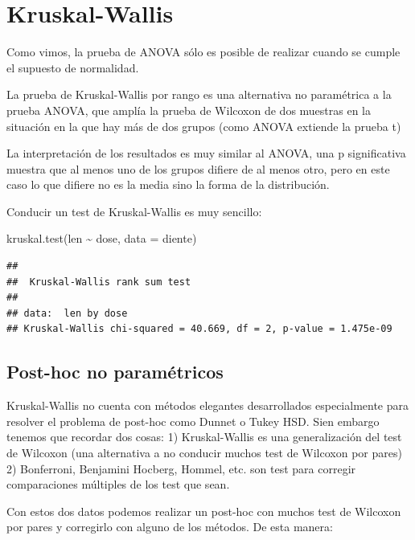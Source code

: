 \documentclass[
]{book}
\newenvironment{Shaded}{\begin{snugshade}}{\end{snugshade}}
\newcommand{\AttributeTok}[1]{\textcolor[rgb]{0.77,0.63,0.00}{#1}}
\newcommand{\FunctionTok}[1]{\textcolor[rgb]{0.00,0.00,0.00}{#1}}
\newcommand{\NormalTok}[1]{#1}
\newcommand{\SpecialCharTok}[1]{\textcolor[rgb]{0.00,0.00,0.00}{#1}}
\begin{document}
\hypertarget{kruskal-wallis}{%
\section{Kruskal-Wallis}\label{kruskal-wallis}}

Como vimos, la prueba de ANOVA sólo es posible de realizar cuando se cumple el supuesto de normalidad.

La prueba de Kruskal-Wallis por rango es una alternativa no paramétrica a la prueba ANOVA, que amplía la prueba de Wilcoxon de dos muestras en la situación en la que hay más de dos grupos (como ANOVA extiende la prueba t)

La interpretación de los resultados es muy similar al ANOVA, una p significativa muestra que al menos uno de los grupos difiere de al menos otro, pero en este caso lo que difiere no es la media sino la forma de la distribución.

Conducir un test de Kruskal-Wallis es muy sencillo:

\begin{Shaded}
\begin{Highlighting}[]
\FunctionTok{kruskal.test}\NormalTok{(len }\SpecialCharTok{\textasciitilde{}}\NormalTok{ dose, }\AttributeTok{data =}\NormalTok{ diente)}
\end{Highlighting}
\end{Shaded}

\begin{verbatim}
## 
##  Kruskal-Wallis rank sum test
## 
## data:  len by dose
## Kruskal-Wallis chi-squared = 40.669, df = 2, p-value = 1.475e-09
\end{verbatim}

\hypertarget{post-hoc-no-paramuxe9tricos}{%
\subsection{Post-hoc no paramétricos}\label{post-hoc-no-paramuxe9tricos}}

Kruskal-Wallis no cuenta con métodos elegantes desarrollados especialmente para resolver el problema de post-hoc como Dunnet o Tukey HSD. Sien embargo tenemos que recordar dos cosas: 1) Kruskal-Wallis es una generalización del test de Wilcoxon (una alternativa a no conducir muchos test de Wilcoxon por pares) 2) Bonferroni, Benjamini Hocberg, Hommel, etc. son test para corregir comparaciones múltiples de los test que sean.

Con estos dos datos podemos realizar un post-hoc con muchos test de Wilcoxon por pares y corregirlo con alguno de los métodos. De esta manera:
\end{document}
